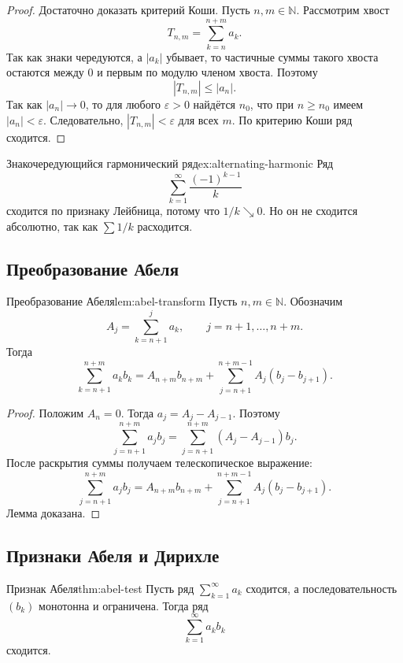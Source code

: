 \begin{proof}
Достаточно доказать критерий Коши. Пусть \(n,m\in\mathbb N\). Рассмотрим хвост
\[
T_{n,m}=\sum_{k=n}^{n+m}a_k.
\]
Так как знаки чередуются, а \(|a_k|\) убывает, то частичные суммы такого хвоста остаются между \(0\) и первым по модулю членом хвоста. Поэтому
\[
|T_{n,m}|\le |a_n|.
\]
Так как \(|a_n|\to 0\), то для любого \(\varepsilon>0\) найдётся \(n_0\), что при \(n\ge n_0\) имеем \(|a_n|<\varepsilon\). Следовательно, \(|T_{n,m}|<\varepsilon\) для всех \(m\). По критерию Коши ряд сходится. 
\end{proof}

\begin{Example}{Знакочередующийся гармонический ряд}{ex:alternating-harmonic}
	Ряд
	\[
	\sum_{k=1}^{\infty}\frac{(-1)^{k-1}}{k}
	\]
	сходится по признаку Лейбница, потому что \(1/k\searrow 0\). Но он не сходится абсолютно, так как \(\sum 1/k\) расходится.
\end{Example}

\subsection{Преобразование Абеля}

\begin{Lemma}{Преобразование Абеля}{lem:abel-transform}
	Пусть \(n,m\in\mathbb N\). Обозначим
	\[
	A_j=\sum_{k=n+1}^{j}a_k,\qquad j=n+1,\dots,n+m.
	\]
	Тогда
	\[
	\sum_{k=n+1}^{n+m}a_kb_k
	=
	A_{n+m}b_{n+m}
	+
	\sum_{j=n+1}^{n+m-1}A_j(b_j-b_{j+1}).
	\]
\end{Lemma}

\begin{proof}
Положим \(A_n=0\). Тогда \(a_j=A_j-A_{j-1}\). Поэтому
\[
\sum_{j=n+1}^{n+m}a_jb_j
=
\sum_{j=n+1}^{n+m}(A_j-A_{j-1})b_j.
\]
После раскрытия суммы получаем телескопическое выражение:
\[
\sum_{j=n+1}^{n+m}a_jb_j
=
A_{n+m}b_{n+m}
+
\sum_{j=n+1}^{n+m-1}A_j(b_j-b_{j+1}).
\]
Лемма доказана. 
\end{proof}

\subsection{Признаки Абеля и Дирихле}

\begin{Theorem}{Признак Абеля}{thm:abel-test}
	Пусть ряд \(\sum_{k=1}^{\infty}a_k\) сходится, а последовательность \((b_k)\) монотонна и ограничена. Тогда ряд
	\[
	\sum_{k=1}^{\infty}a_kb_k
	\]
	сходится.
\end{Theorem}



